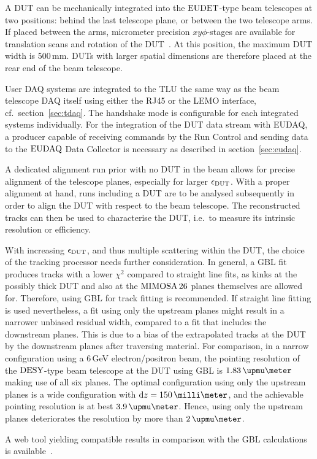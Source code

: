 A DUT can be mechanically integrated into the $\textrm{EUDET}$-type beam telescopes at two positions: behind the last telescope plane, or between the two telescope arms.
If placed between the arms, micrometer precision $xy\phi$-stages are available for translation scans and rotation of the DUT~\cite{Mimosa-twiki}.
At this position, the maximum DUT width is 500\,mm.
DUTs with larger spatial dimensions are therefore placed at the rear end of the beam telescope. 

User DAQ systems are integrated to the TLU the same way as the beam telescope DAQ itself using either the RJ45 or the LEMO interface, cf.~section~\ref{sec:tdaq}.
The handshake mode is configurable for each integrated systems individually. 
For the integration of the DUT data stream with EUDAQ, a producer capable of receiving commands by the Run Control and sending data to the $\textrm{EUDAQ}$ Data Collector is necessary
 as described in section~\ref{sec:eudaq}.

A dedicated alignment run prior with no DUT in the beam allows for precise alignment of the telescope planes, especially for larger $\mathnormal{\epsilon_{\textrm{DUT}}}$. 
With a proper alignment at hand, runs including a DUT are to be analysed subsequently in order to align the DUT with respect to the beam telescope. 
The reconstructed tracks can then be used to characterise the DUT, i.e.~to measure its intrinsic resolution or efficiency. 

With increasing $\mathnormal{\epsilon_{\textrm{DUT}}}$, and thus multiple scattering within the DUT, the choice of the tracking processor needs further consideration. 
In general, a GBL fit produces tracks with a lower $\chi^2$ compared to straight line fits,
 as kinks at the possibly thick DUT and also at the $\textrm{MIMOSA\,26}$ planes themselves are allowed for.
Therefore, using GBL for track fitting is recommended. 
If straight line fitting is used nevertheless, a fit using only the upstream planes might result in a narrower unbiased residual width, compared to a fit that includes the downstream planes. 
This is due to a bias of the extrapolated tracks at the DUT by the downstream planes after traversing material. 
For comparison, in a narrow configuration using a 6\,GeV electron/positron beam,
 the pointing resolution of the $\textrm{DESY}$-type beam telescope at the DUT using GBL is $1.83\,\upmu\meter$ making use of all six planes. 
The optimal configuration using only the upstream planes is a wide configuration with $\dz = 150\,\milli\meter$,
 and the achievable pointing resolution is at best $3.9\,\upmu\meter$. 
Hence, using only the upstream planes deteriorates the resolution by more than $2\,\upmu\meter$.

A web tool yielding compatible results in comparison with the GBL calculations is available~\cite{webtool}.
